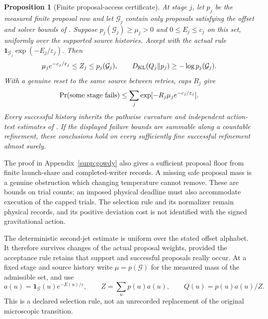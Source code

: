 \documentclass[11pt]{article}
\numberwithin{equation}{section}
\newtheorem{proposition}[proposition]{Proposition}
\theoremstyle{definition}
\theoremstyle{remark}
\newcommand{\one}{\mathbf 1}
\begin{document}
\begin{proposition}[Finite proposal-access certificate]
\label{prop:main-safe-access}
At stage $j$, let $p_j$ be the measured finite proposal row and let
$\mathcal G_j$ contain only proposals satisfying the offset and solver bounds
of .  Suppose
$p_j(\mathcal G_j)\ge\mu_j>0$ and $0\le E_j\le c_j$ on this set,
uniformly over the supported source histories.  Accept with the actual rule
$\one_{\mathcal G_j}\exp(-E_j/\varepsilon_j)$.  Then
\begin{equation}
 \mu_j e^{-c_j/\varepsilon_j}\le Z_j\le p_j(\mathcal G_j),
 \qquad
 D_{\rm KL}(Q_j\Vert p_j)\ge-\log p_j(\mathcal G_j).
 \label{eq:main-safe-proposal-bounds}
\end{equation}
With a genuine reset to the same source between retries, caps $R_j$ give
\begin{equation}
 \Pr(\hbox{some stage fails})
       \le\sum_j\exp[-R_j\mu_j e^{-c_j/\varepsilon_j}].
 \label{eq:main-safe-retry-bound}
\end{equation}
Every successful history inherits the pathwise curvature and independent
action-test estimates of .  If the displayed
failure bounds are summable along a countable refinement, these conclusions
hold on every sufficiently fine successful refinement almost surely.
\end{proposition}

The proof in Appendix~\ref{supp:gowdy} also gives a sufficient proposal floor
from finite launch-share and completed-writer records.  A missing safe
proposal mass is a genuine obstruction which changing temperature cannot
remove.  These are bounds on trial counts; an imposed physical deadline must
also accommodate execution of the capped trials.  The selection rule and its
normalizer remain physical records, and its positive deviation cost is not
identified with the signed gravitational action.


The deterministic second-jet estimate is uniform over the stated offset
alphabet.  It therefore survives changes of the actual proposal weights,
provided the acceptance rule retains that support and successful proposals
really occur.  At a fixed stage and source history write
$\mu=p(\mathcal G)$ for the measured mass of the admissible set, and use
\[
 a(u)=\one_{\mathcal G}(u)e^{-E(u)/\varepsilon},\qquad
 Z=\sum_up(u)a(u),\qquad Q(u)=p(u)a(u)/Z.
\]
This is a declared selection rule, not an unrecorded replacement of the
original microscopic transition.
\end{document}
